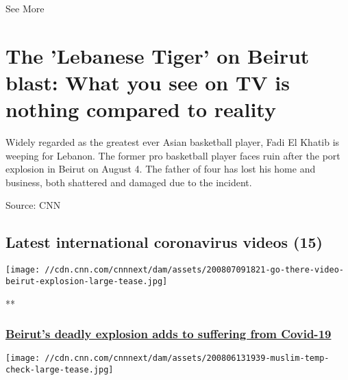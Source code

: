 See More

\hypertarget{the-lebanese-tiger-on-beirut-blast-what-you-see-on-tv-is-nothing-compared-to-reality-2}{%
\section{The 'Lebanese Tiger' on Beirut blast: What you see on TV is
nothing compared to
reality}\label{the-lebanese-tiger-on-beirut-blast-what-you-see-on-tv-is-nothing-compared-to-reality-2}}

Widely regarded as the greatest ever Asian basketball player, Fadi El
Khatib is weeping for Lebanon. The former pro basketball player faces
ruin after the port explosion in Beirut on August 4. The father of four
has lost his home and business, both shattered and damaged due to the
incident.

Source: CNN

\hypertarget{latest-international-coronavirus-videos-15}{%
\subsection{Latest international coronavirus videos
(15)}\label{latest-international-coronavirus-videos-15}}

\href{/videos/world/2020/08/07/beirut-explosion-amplifies-coronavirus-economic-struggles-go-there.cnn/video/playlists/coronavirus-intl/}{}

\texttt{[image: //cdn.cnn.com/cnnnext/dam/assets/200807091821-go-there-video-beirut-explosion-large-tease.jpg]}

**

\hypertarget{beiruts-deadly-explosion-adds-to-suffering-from-covid-19}{%
\subsubsection{\texorpdfstring{\href{/videos/world/2020/08/07/beirut-explosion-amplifies-coronavirus-economic-struggles-go-there.cnn/video/playlists/coronavirus-intl/}{Beirut's
deadly explosion adds to suffering from
Covid-19}}{Beirut's deadly explosion adds to suffering from Covid-19}}\label{beiruts-deadly-explosion-adds-to-suffering-from-covid-19}}

\href{/videos/world/2020/08/06/england-lockdown-on-eid-eve-muslims-veselinovic-vpx.cnn/video/playlists/coronavirus-intl/}{}

\texttt{[image: //cdn.cnn.com/cnnnext/dam/assets/200806131939-muslim-temp-check-large-tease.jpg]}

